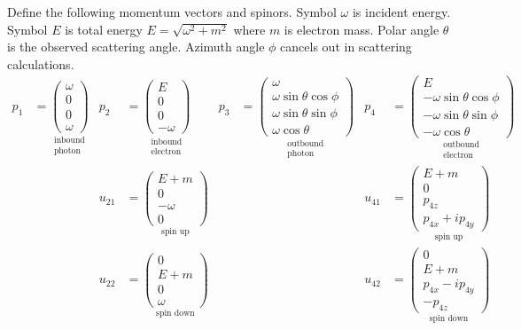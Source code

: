 \documentclass[12pt]{article}
\begin{document}
Define the following momentum vectors and spinors.
Symbol $\omega$ is incident energy.
Symbol $E$ is total energy $E=\sqrt{\omega^2+m^2}$ where $m$ is electron mass.
Polar angle $\theta$ is the observed scattering angle.
Azimuth angle $\phi$ cancels out in scattering calculations.
\iffalse
\begin{align*}
p_1&=
\underset{\substack{\text{inbound}\\\text{photon}}}
{
\begin{pmatrix}\omega\\0\\0\\ \omega\end{pmatrix}
}
&
p_2&=
\underset{\substack{\text{inbound}\\\text{electron}}}
{
\begin{pmatrix}E\\0\\0\\-\omega\end{pmatrix}
}
&
p_3&=
\underset{\substack{\text{outbound}\\\text{photon}}}
{
\begin{pmatrix}
\omega\\
\omega\sin\theta\cos\phi\\
\omega\sin\theta\sin\phi\\
\omega\cos\theta
\end{pmatrix}
}
&
p_4&=
\underset{\substack{\text{outbound}\\\text{electron}}}
{
\begin{pmatrix}
E\\
-\omega\sin\theta\cos\phi\\
-\omega\sin\theta\sin\phi\\
-\omega\cos\theta
\end{pmatrix}
}
\\[1ex]
& & u_{21}&=
\underset{\text{spin up}}
{
\begin{pmatrix}
E+m\\
0\\
-\omega\\
0
\end{pmatrix}
}
&
& & u_{41}&=
\underset{\text{spin up}}
{
\begin{pmatrix}
E+m\\
0\\
p_{4z}\\
p_{4x}+ip_{4y}
\end{pmatrix}
}
\\[1ex]
& & u_{22}&=
\underset{\text{spin down}}
{
\begin{pmatrix}
0\\
E+m\\
0\\
\omega
\end{pmatrix}
}
&
& & u_{42}&=
\underset{\text{spin down}}
{
\begin{pmatrix}
0\\
E+m\\
p_{4x}-ip_{4y}\\
-p_{4z}
\end{pmatrix}
}
\end{align*}
\end{document}
